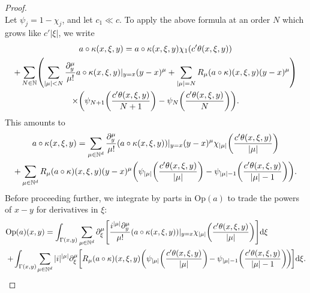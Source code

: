 \documentclass[10pt]{amsart}
\theoremstyle{definition}\newtheorem{defi}[theo]{Definition}\newtheorem{rema}[theo]{Remark}\newtheorem{exam}[theo]{Example}\newtheorem{exem}[theo]{Example}\newtheorem{nota}[theo]{Notation}
\newcommand{\Opp}{\mathrm{Op}}
\newcommand\1{\mathds{1}}
\newcommand{\N}{\mathbb{N}}
\newcommand{\dd}{\mathrm{d}}
\newcommand*{\Mk}{\mkern -2mu}
\let\originalleft\left
\let\originalright\right
\renewcommand{\left}{\mathopen{}\mathclose\bgroup\originalleft}
\renewcommand{\right}{\aftergroup\egroup\originalright}
\begin{document}
\begin{proof}
\[\]
Let $\psi_j=1-\chi_j$, and let $c_1\ll c$. To apply the above formula at an order $N$ which grows like $c'|\xi|$, we write
\begin{multline*}
a\circ \kappa(x,\xi,y)=a\circ \kappa(x,\xi,y)\chi_1(c'\theta(x,\xi,y))\\+\sum_{N\in
\N}\left(\sum_{|\mu|<N}\frac{\partial^{\mu}_y}{\mu!}a\circ
\kappa(x,\xi,y)|_{y=x}(y-x)^{\mu}+\sum_{|\mu|=N}R_\mu(a\circ
\kappa)(x,\xi,y)(y-x)^{\mu}\right)\\ 
\times \left(\psi_{N+1}\left(\frac{c'\theta(x,\xi,y)}{N+1}\right)-\psi_{N}\left(\frac{c'\theta(x,\xi,y)}{N}\right)\right).
\end{multline*}
This amounts to
\begin{multline*}
a\circ \kappa(x,\xi,y)
=\sum_{\mu\in
\N^d}\frac{\partial_y^{\mu}}{\mu!}(a\circ
\kappa(x,\xi,y))|_{y=x}(y-x)^{\mu}\chi_{|\mu|}\left(\frac{c'\theta(x,\xi,y)}{|\mu|}\right)\\
+\sum_{\mu\in
\N^d}R_{\mu}(a\circ \kappa)(x,\xi,y)(y-x)^{\mu}\left(\psi_{|\mu|}\left(\frac{c'\theta(x,\xi,y)}{|\mu|}\right)-\psi_{|\mu|-1}\left(\frac{c'\theta(x,\xi,y)}{|\mu|-1}\right)\right).
\end{multline*}
Before proceeding further, we integrate by parts in $\Opp(a)$ to trade the powers of $x-y$ for derivatives in $\xi$:
\begin{align*}
&\Opp(a)(x,y)=\int_{\Gamma(x,y)}\sum_{\mu\in
\N^d}\partial_{\xi}^{\mu}\left[\frac{i^{|\mu|}\partial_y^{\mu}}{\mu!}(a\circ
\kappa(x,\xi,y))|_{y=x}\chi_{|\mu|}\left(\frac{c'\theta(x,\xi,y)}{|\mu|}\right)\right]\dd
\xi\\
&+\Mk\int_{\Gamma(x,y)}\Mk\sum_{\mu\in
\N^d}|i|^{|\mu|}\partial_{\xi}^{\mu}\left[R_{\mu}(a\circ
\kappa)(x,\xi,y)\left(\psi_{|\mu|}\left(\frac{c'\theta(x,\xi,y)}{|\mu|}\right)\Mk-\psi_{|\mu|-1}\left(\frac{c'\theta(x,\xi,y)}{|\mu|-1}\right)\Mk\right)\Mk\right]\dd \xi.
\end{align*}


\end{proof}
\end{document}
